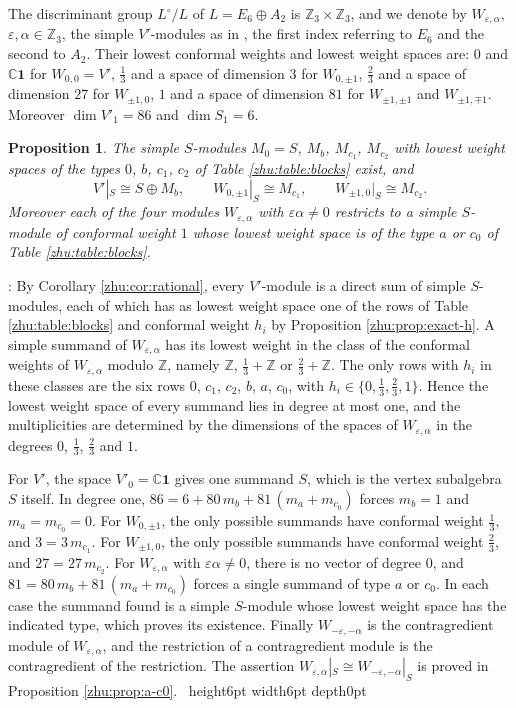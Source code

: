\documentclass[leqno]{article}
\newcommand{\Cbb}{\ensuremath{\mathbb{C}}}
\newcommand{\Z}{\ensuremath{\mathbb{Z}}}
\newcommand{\qed}{\hfill \vrule height6pt  width6pt depth0pt}
\newcommand{\epsi}{\varepsilon}
\newtheorem{prop}[thm]{Proposition}
\newenvironment{proof}[1][]{\noindent {\it Proof #1} : }{\hbox{~}\qed
\smallskip
}
\numberwithin{equation}{section}
\begin{document}
The discriminant group $L^\circ/L$ of $L = E_6 \oplus A_2$ is $\Z_3 \times \Z_3$, and we denote by $W_{\epsi,\alpha}$, $\epsi,\alpha \in \Z_3$, the simple $V'$-modules as in \cite[Remark 11.2]{Arh26}, the first index referring to $E_6$ and the second to $A_2$. Their lowest conformal weights and lowest weight spaces are: $0$ and $\Cbb\mathbf 1$ for $W_{0,0} = V'$, $\frac13$ and a space of dimension $3$ for $W_{0,\pm1}$, $\frac23$ and a space of dimension $27$ for $W_{\pm1,0}$, $1$ and a space of dimension $81$ for $W_{\pm1,\pm1}$ and $W_{\pm1,\mp1}$. Moreover $\dim V'_1 = 86$ and $\dim S_1 = 6$.

\begin{prop}
\label{zhu:prop:restrictions}
The simple $S$-modules $M_0 = S$, $M_b$, $M_{c_1}$, $M_{c_2}$ with lowest weight spaces of the types $0$, $b$, $c_1$, $c_2$ of Table \ref{zhu:table:blocks} exist, and
\[
V'|_S \cong S \oplus M_b, \qquad W_{0,\pm1}|_S \cong M_{c_1}, \qquad W_{\pm1,0}|_S \cong M_{c_2}.
\]
Moreover each of the four modules $W_{\epsi,\alpha}$ with $\epsi\alpha \neq 0$ restricts to a simple $S$-module of conformal weight $1$ whose lowest weight space is of the type $a$ or $c_0$ of Table \ref{zhu:table:blocks}.
\end{prop}

\begin{proof}
By Corollary \ref{zhu:cor:rational}, every $V'$-module is a direct sum of simple $S$-modules, each of which has as lowest weight space one of the rows of Table \ref{zhu:table:blocks} and conformal weight $h_i$ by Proposition \ref{zhu:prop:exact-h}. A simple summand of $W_{\epsi,\alpha}$ has its lowest weight in the class of the conformal weights of $W_{\epsi,\alpha}$ modulo $\Z$, namely $\Z$, $\frac13 + \Z$ or $\frac23 + \Z$. The only rows with $h_i$ in these classes are the six rows $0$, $c_1$, $c_2$, $b$, $a$, $c_0$, with $h_i \in \{0, \frac13, \frac23, 1\}$. Hence the lowest weight space of every summand lies in degree at most one, and the multiplicities are determined by the dimensions of the spaces of $W_{\epsi,\alpha}$ in the degrees $0$, $\frac13$, $\frac23$ and $1$.

For $V'$, the space $V'_0 = \Cbb\mathbf 1$ gives one summand $S$, which is the vertex subalgebra $S$ itself. In degree one, $86 = 6 + 80\, m_b + 81\,(m_a + m_{c_0})$ forces $m_b = 1$ and $m_a = m_{c_0} = 0$. For $W_{0,\pm1}$, the only possible summands have conformal weight $\frac13$, and $3 = 3\,m_{c_1}$. For $W_{\pm1,0}$, the only possible summands have conformal weight $\frac23$, and $27 = 27\,m_{c_2}$. For $W_{\epsi,\alpha}$ with $\epsi\alpha \neq 0$, there is no vector of degree $0$, and $81 = 80\,m_b + 81\,(m_a + m_{c_0})$ forces a single summand of type $a$ or $c_0$. In each case the summand found is a simple $S$-module whose lowest weight space has the indicated type, which proves its existence. Finally $W_{-\epsi,-\alpha}$ is the contragredient module of $W_{\epsi,\alpha}$, and the restriction of a contragredient module is the contragredient of the restriction. The assertion $W_{\epsi,\alpha}|_S \cong W_{-\epsi,-\alpha}|_S$ is proved in Proposition \ref{zhu:prop:a-c0}.
\end{proof}
\end{document}
